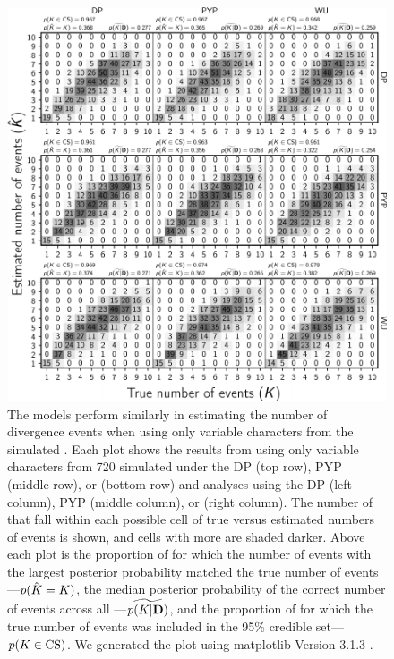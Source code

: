 \begin{figure}[htbp]
    \begin{center}
        \includegraphics[width=\textwidth,height=\textheight,keepaspectratio]{../images/from-project-repo/var-only-infer-columns-by-data-rows-nevents-cropped-rasterized.pdf}
        \captionsetup{name=Figure S, labelformat=noSpace, listformat=sFigList}
        \caption{
        The models perform similarly in estimating the number of divergence
        events when using only variable characters from the simulated
        \datasets.
        Each plot shows the results from using only variable characters from
        720 \datasets simulated under the
        DP (top row),
        PYP (middle row),
        or
        \wunif (bottom row)
        and analyses using the
        DP (left column),
        PYP (middle column),
        or
        \wunif (right column).
        The number of \datasets that fall within each possible cell of true
        versus estimated numbers of events is shown, and cells with more
        \datasets are shaded darker.
        Above each plot is
        the proportion of \datasets for which the number of events with the largest
        posterior probability matched the true number of events---$p(\hat{K_{}}
        = K_{})$,
        the median posterior probability of the correct number of events across all
        \datasets---$\widetilde{p(K_{}|\mathbf{D})}$, and
        the proportion of \datasets for which the true number of events was
        included in the 95\% credible set---$p(K_{} \in
        \textrm{CS})$.
        We generated the plot using matplotlib Version 3.1.3
        \citep{matplotlib}.
        }
        \label{fig:varonlyneventsgrid}
    \end{center}
\end{figure}


